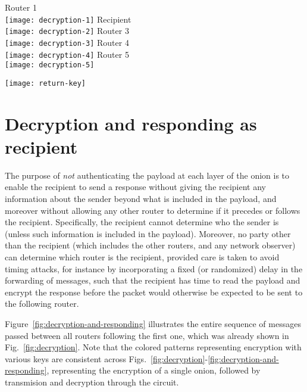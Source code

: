 \documentclass[letterpaper,twocolumn,amsmath,amssymb,pre,aps,10pt]{revtex4-1}
\begin{document}
\begin{figure*}
  \begin{center}
    Router 1\\
    \texttt{[image: decryption-1]}
    Recipient\\
    \texttt{[image: decryption-2]}
    Router 3\\
    \texttt{[image: decryption-3]}
    Router 4\\
    \texttt{[image: decryption-4]}
    Router 5\\
    \texttt{[image: decryption-5]}
  \end{center}
  \caption{A diagram of the decryption and responding
    process.}\label{fig:decryption-and-responding}
\end{figure*}

\begin{figure*}
  \begin{center}
    \texttt{[image: return-key]}
  \end{center}
  \caption{Finding the return key.}\label{fig:return-key}
\end{figure*}

\section{Decryption and responding as recipient}

The purpose of \emph{not} authenticating the payload at each layer of
the onion is to enable the recipient to send a response without giving
the recipient any information about the sender beyond what is included
in the payload, and moreover without allowing any other router to
determine if it precedes or follows the recipient.  Specifically, the
recipient cannot determine who the sender is (unless such information
is included in the payload).  Moreover, no party other than the
recipient (which includes the other routers, and any network observer)
can determine which router is the recipient, provided care is taken to
avoid timing attacks, for instance by incorporating a fixed (or
randomized) delay in the forwarding of messages, such that the
recipient has time to read the payload and encrypt the response before
the packet would otherwise be expected to be sent to the following
router.

Figure~\ref{fig:decryption-and-responding} illustrates the entire
sequence of messages passed between all routers following the first
one, which was already shown in Fig.~\ref{fig:decryption}.  Note that
the colored patterns representing encryption with various keys are
consistent across
Figs.~\ref{fig:decryption}-\ref{fig:decryption-and-responding},
representing the encryption of a single onion, followed by transmision
and decryption through the circuit.
\end{document}

